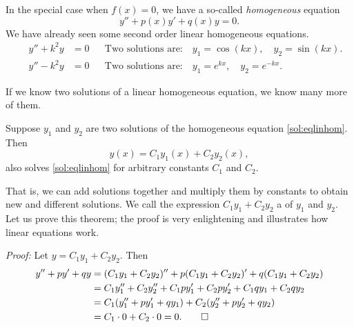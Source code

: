In the special case when $f(x) = 0$, we have a so-called
\emph{homogeneous}
equation
\begin{equation} \label{sol:eqlinhom}
y'' + p(x)y' + q(x)y = 0 .
\end{equation}
We have already seen some second order linear homogeneous equations.
\begin{align*}
\qquad y'' + k^2 y & = 0 &
& \text{Two solutions are:} \quad y_1 = \cos (kx), \quad y_2 = \sin(kx) . \qquad \\
\qquad y'' - k^2 y & = 0 &
& \text{Two solutions are:} \quad y_1 = e^{kx}, \quad y_2 = e^{-kx} . \qquad
\end{align*}

If we know two solutions of a linear homogeneous equation, we know many
more of them.

\begin{theorem}[Superposition]
Suppose $y_1$ and $y_2$ are two solutions of the
homogeneous equation \eqref{sol:eqlinhom}.  Then 
\begin{equation*}
y(x) = C_1 y_1(x) + C_2 y_2(x) ,
\end{equation*}
also solves \eqref{sol:eqlinhom} for arbitrary constants $C_1$ and $C_2$.
\end{theorem}

That is, we can add solutions together and multiply them by constants to
obtain new and different solutions.  We call
the expression $C_1 y_1 + C_2 y_2$ a
\emph{} of $y_1$ and $y_2$.
Let us
prove this theorem; the
proof is very enlightening and illustrates how linear equations work.

\medskip

\emph{Proof:}
Let 
$y = C_1 y_1 + C_2 y_2$.  Then
\begin{equation*}
\begin{split}
y'' + py' + qy & =
(C_1 y_1 + C_2 y_2)'' + p(C_1 y_1 + C_2 y_2)' + q(C_1 y_1 + C_2 y_2) \\
& = C_1 y_1'' + C_2 y_2'' + C_1 p y_1' + C_2 p y_2' + C_1 q y_1 + C_2 q y_2 \\
& = C_1 ( y_1'' + p y_1' + q y_1 ) + C_2 ( y_2'' + p y_2' + q y_2 ) \\
& = C_1 \cdot 0 + C_2 \cdot 0 = 0 . \qed
\end{split}
\end{equation*}

\medskip

